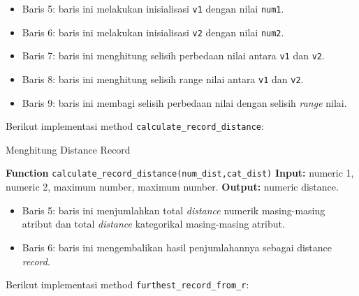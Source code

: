 \vspace{0.2cm}
\begin{itemize}
\item Baris 5: baris ini melakukan inisialisasi \texttt{v1} dengan nilai \texttt{num1}.
\item Baris 6: baris ini melakukan inisialisasi \texttt{v2} dengan nilai \texttt{num2}.
\item Baris 7: baris ini menghitung selisih perbedaan nilai antara \texttt{v1} dan \texttt{v2}.
\item Baris 8: baris ini menghitung selisih range nilai antara \texttt{v1} dan \texttt{v2}.
\item Baris 9: baris ini membagi selisih perbedaan nilai dengan selisih \textit{range} nilai.
\end{itemize}


\noindent Berikut implementasi method \texttt{calculate\_record\_distance}:

\begin{minipage}{.85\linewidth}
\begin{algorithm}[H]
  \caption{Menghitung Distance Record}\label{alg:6}
  \begin{algorithmic}[1]
  \State \textbf{Function} \texttt{calculate\_record\_distance(num\_dist,cat\_dist)}
  \State \textbf{Input:} numeric 1, numeric 2, maximum number, maximum number.
  \State \textbf{Output:} numeric distance.
  \\
  \end{algorithmic}
\end{algorithm}
\end{minipage}

\vspace{0.2cm}
\begin{itemize}
\item Baris 5: baris ini menjumlahkan total \textit{distance} numerik masing-masing atribut dan total \textit{distance} kategorikal masing-masing atribut.
\item Baris 6: baris ini mengembalikan hasil penjumlahannya sebagai distance \textit{record}.
\end{itemize}

\newpage
\noindent Berikut implementasi method \texttt{furthest\_record\_from\_r}:

